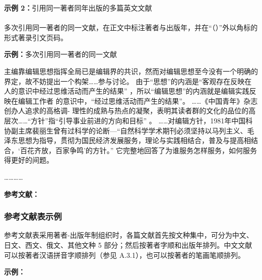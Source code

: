 \documentclass{article}
\newlength{\indentedpara}
\begin{document}
\begin{refsection}
\textbf{示例 2：}引用同一著者同年出版的多篇英文文献
\nocite{KENNEDY1975-311-386,KENNEDY1975-339-360}

\parbox{2em}{}\parbox{\indentedpara}{\printbibliography[heading=none]}
\end{refsection}


\paragraph{} 多次引用同一著者的同一文献，在正文中标注著者与出版年，并在“（）”外以角标的形式著录引文页码。

\begin{refsection}
\textbf{示例：}多次引用同一著者的同一文献

主编靠编辑思想指挥全局已是编辑界的共识\cite{张忠智1997-33-34}，然而对编辑思想至今没有一个明确的界定，故不妨提出一个构架……参与讨论。
由于“思想”的内涵是“客观存在反映在人的意识中经过思维活动而产生的结果”
，所以“编辑思想”的内涵就是编辑实践反映在编辑工作者
的意识中，“经过思维活动而产生的结果”。
……《中国青年》杂志创办人追求的高格调-
理性的成熟与热点的凝聚\cite{刘彻东1998-38-39}，表明其读者群的文化的品位的高层次……“方针”指“引导事业前进的方向和目标”
。
……对编辑方针，1981年中国科协副主席裴丽生曾有过科学的论断—“自然科学学术期刊必须坚持以马列主义、毛泽东思想为指导，贯彻为国民经济发展服务，理论与实践相结合，普及与提高相结合，‘百花齐放，百家争鸣’的方针。” \cite{裴丽生1981-2-10}它完整地回答了为谁服务怎样服务，如何服务得更好的间题。

…………


\textbf{参考文献：}

\newrefcontext[sorting=gb7714-2015]{}
\parbox{2em}{}\parbox{\indentedpara}{\printbibliography[heading=none]}
\end{refsection}


\subsubsection{参考文献表示例}
\begin{refsection}
参考文献表采用著者-出版年制组织时，各篇文献首先按文种集中，可分为中文、日文、西文、俄文、其他文种 5 部分；然后按著者字顺和出版年排列。中文文献可以按著者汉语拼音字顺排列（参见 A.3.1），也可以按著者的笔画笔顺排列。

\nocite{尼葛洛庞帝1996--,汪冰1997-16-16,杨宗英1996-24-29,Baker1995--,Chernik1982--,Dowler1995-5-26}

\textbf{示例：}

\parbox{2em}{}\parbox{\indentedpara}{\printbibliography[heading=none]}
\end{refsection}
\end{document}
